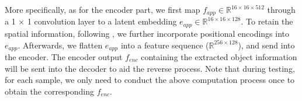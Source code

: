 \documentclass[10pt,twocolumn,letterpaper]{article}
\begin{document}
\begin{table}
\caption{Comparisons with RGB-based 6D object pose estimation methods on the YCB-V dataset. (-) indicates the corresponding result is not reported in the original paper.}
  \vspace{-0.3cm}
  \centering
\vspace{-0.4cm}
\label{tab:ycbv_results_table}
\end{table}
More specifically, as for the encoder part, we first map $f_{app} \in \mathbb{R}^{16 \times 16 \times 512}$ through a 1 × 1 convolution layer to a latent embedding $e_{app} \in \mathbb{R}^{ 16 \times 16 \times 128 }$.
To retain the spatial information, following \cite{vaswani2017attention}, we further incorporate positional encodings into $e_{app}$.
Afterwards, we flatten $e_{app}$ into a feature sequence ($\mathbb{R}^{256 \times 128}$), and send into the encoder.
The encoder output $f_{enc}$ containing the extracted object information will be sent into the decoder to aid the reverse process.
Note that during testing, for each sample, we only need to conduct the above computation process once to obtain the corresponding $f_{enc}$.
\end{document}
